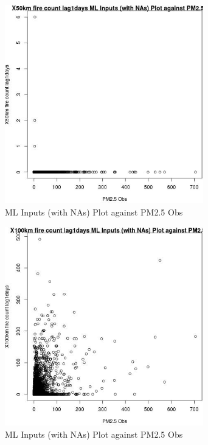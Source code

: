 \begin{figure} 
\centering  
\includegraphics[width=0.77\textwidth]{Code_Outputs/Report_ML_input_PM25_Step4_part_e_de_duplicated_aves_compiled_2019-05-14wNAs_X50km_fire_count_lag1daysvPM25_Obs.jpg} 
\caption{\label{fig:Report_ML_input_PM25_Step4_part_e_de_duplicated_aves_compiled_2019-05-14wNAsX50km_fire_count_lag1daysvPM25_Obs}ML Inputs (with NAs) Plot against PM2.5 Obs} 
\end{figure} 
 

\begin{figure} 
\centering  
\includegraphics[width=0.77\textwidth]{Code_Outputs/Report_ML_input_PM25_Step4_part_e_de_duplicated_aves_compiled_2019-05-14wNAs_X100km_fire_count_lag1daysvPM25_Obs.jpg} 
\caption{\label{fig:Report_ML_input_PM25_Step4_part_e_de_duplicated_aves_compiled_2019-05-14wNAsX100km_fire_count_lag1daysvPM25_Obs}ML Inputs (with NAs) Plot against PM2.5 Obs} 
\end{figure} 
 

